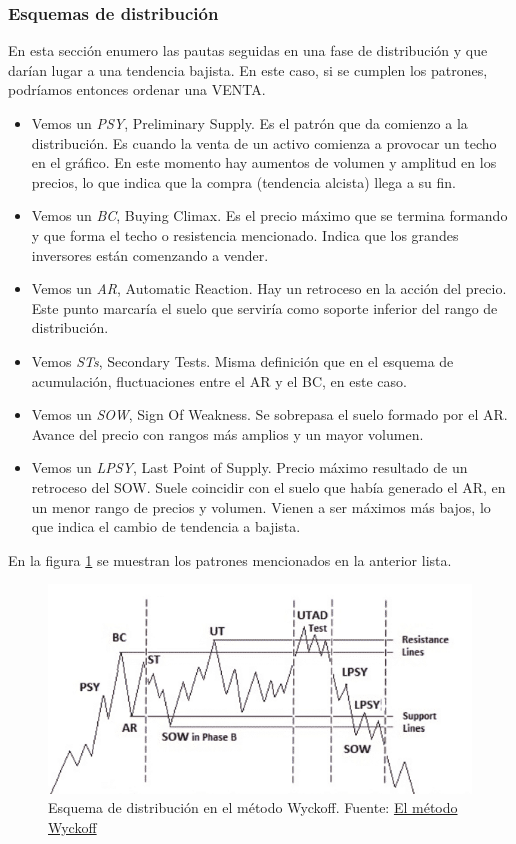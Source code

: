 \subsubsection{Esquemas de distribución}

En esta sección enumero las pautas seguidas en una fase de distribución y que darían lugar a una tendencia bajista. En este caso, si se cumplen los patrones, podríamos entonces ordenar una VENTA.

\begin{itemize}
	\item Vemos un \textit{PSY}, Preliminary Supply. Es el patrón que da comienzo a la distribución. Es cuando la venta de un activo comienza a provocar un techo en el gráfico. En este momento hay aumentos de volumen y amplitud en los precios, lo que indica que la compra (tendencia alcista) llega a su fin.
	\item Vemos un \textit{BC}, Buying Climax. Es el precio máximo que se termina formando y que forma el techo o resistencia mencionado. Indica que los grandes inversores están comenzando a vender.
	\item Vemos un \textit{AR}, Automatic Reaction. Hay un retroceso en la acción del precio. Este punto marcaría el suelo que serviría como soporte inferior del rango de distribución.
	\item Vemos \textit{STs}, Secondary Tests. Misma definición que en el esquema de acumulación, fluctuaciones entre el AR y el BC, en este caso.
	\item Vemos un \textit{SOW}, Sign Of Weakness. Se sobrepasa el suelo formado por el AR. Avance del precio con rangos más amplios y un mayor volumen.
	\item Vemos un \textit{LPSY}, Last Point of Supply. Precio máximo resultado de un retroceso del SOW. Suele coincidir con el suelo que había generado el AR, en un menor rango de precios y volumen. Vienen a ser máximos más bajos, lo que indica el cambio de tendencia a bajista.
\end{itemize}

En la figura \ref{esquema_distribucion} se muestran los patrones mencionados en la anterior lista. \newline


\begin{figure}[h]
	\includegraphics[width=1\textwidth]{imagenes/esquema_distribucion_wyckoff.png} 
	\caption{Esquema de distribución en el método Wyckoff. Fuente: \color{blue} \href{https://www.wyckoffanalytics.com/wyckoff-method-spanish/}{El método Wyckoff}} \label{esquema_distribucion}
\end{figure}


